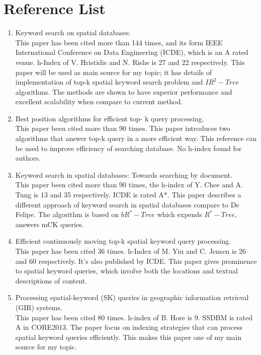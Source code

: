 \documentclass[a4paper,11pt]{article}
\begin{document}
\section{Reference List}
\begin{enumerate}

\item Keyword search on spatial databases.\cite{ref1} \\ This paper has been cited more than 144 times, and its form IEEE International Conference on Data Engineering (ICDE), which is an A rated venue.  h-Index of V. Hristidis and N. Rishe is 27 and 22 respectively. This paper will be used as main source for my topic; it has details of implementation of top-k spatial keyword search problem and $IR^{2}-Tree$ algorithms. The methods are shown to have superior performance and excellent scalability when compare to current method.

\item Best position algorithms for efficient top- k query processing.\cite{ref2} \\ This paper been cited more than 90 times. This paper introduces two algorithms that answer top-k query in a more efficient way. This reference can be used to improve efficiency of searching database. No h-index found for authors.

\item Keyword search in spatial databases: Towards searching by document.\cite{ref3} \\ This paper been cited more than 90 times, the h-index of Y. Chee and A. Tung is 13 and 35 respectively. ICDE is rated A*. This paper describes a different approach of keyword search in spatial databases compare to De Felipe. The algorithm is based on $bR^*-Tree$ which expends $R^*-Tree$, answers mCK queries.

\item Efficient continuously moving top-k spatial keyword query processing.\cite{ref4} \\ This paper has been cited 36 times. h-Index of M. Yiu and C. Jensen is 26 and 60 respectively. It’s also published by ICDE. This paper gives prominence to spatial keyword queries, which involve both the locations and textual descriptions of content.

\item Processing spatial-keyword (SK) queries in geographic information retrieval (GIR) systems.\cite{ref5} \\ This paper has been cited 80 times. h-index of B. Hore is 9. SSDBM is rated A in CORE2013. The paper focus on indexing strategies that can process spatial keyword queries efficiently. This makes this paper one of my main source for my topic.


\end{enumerate}
\end{document}
